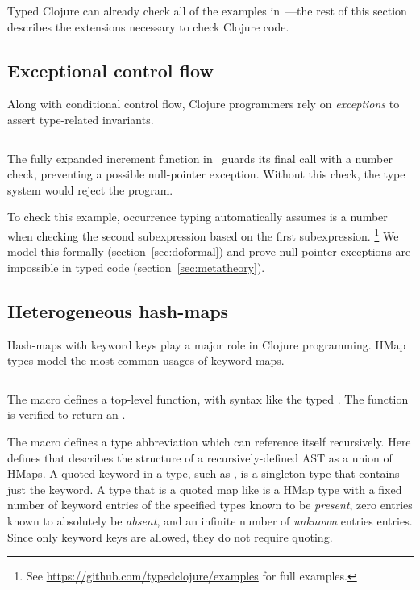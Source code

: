 Typed Clojure can already check all of the examples in~\citet{TF10}---the 
rest of this section describes the extensions necessary
to check Clojure code.

\subsection{Exceptional control flow}

Along with conditional control flow,
Clojure programmers rely on \emph{exceptions}
to assert type-related invariants.

\begin{exmp}
\inputminted[firstline=13,lastline=15]{clojure}{code/demo/src/demo/do.clj}
\label{example:doexception}
\end{exmp}

The fully expanded increment function in~
guards its final call with a number check, preventing
a possible null-pointer exception.
Without this check, the type system would reject the program.

To check this example,
occurrence typing 
automatically
assumes
 is a number when checking the second  subexpression
based on the first subexpression.
\footnote{See \url{https://github.com/typedclojure/examples}
  for full examples.}
We model this formally (section~\ref{sec:doformal}) and prove
null-pointer exceptions are impossible in typed code (section~\ref{sec:metatheory}).

\subsection{Heterogeneous hash-maps}

Hash-maps with keyword keys play a major role in Clojure programming.
HMap types model the most common usages of keyword maps.

\begin{exmp}
\inputminted[firstline=6,lastline=13]{clojure}{code/demo/src/demo/hmap.clj}
\label{example:decleaf}
\end{exmp}

The  macro defines a top-level function, with syntax like the typed .
The function  is verified to return an .

The  macro defines a type abbreviation which can reference itself recursively.
Here  defines 
that describes the structure of a recursively-defined AST as a union of HMaps.
A quoted keyword in a type, such as , is a singleton type that contains just the keyword.
A type that is a quoted map like  is a
HMap type with a fixed number of keyword entries of the specified types
known to be \emph{present},
zero entries known to absolutely be \emph{absent},
and an infinite number of \emph{unknown} entries entries.
Since only keyword keys are allowed, they do not require quoting.

